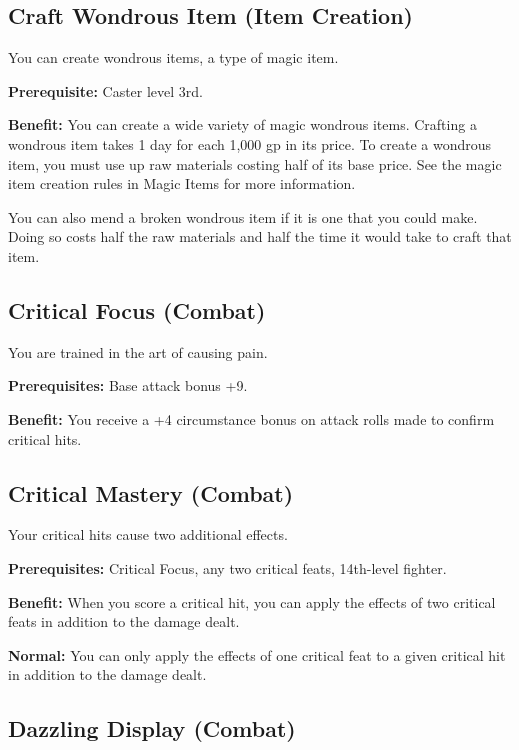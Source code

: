 \subsection{Craft Wondrous Item (Item Creation)}

				
You can create wondrous items, a type of magic item.
				
\textbf{Prerequisite:} Caster level 3rd.
				
\textbf{Benefit:} You can create a wide variety of magic wondrous items. Crafting a wondrous item takes 1 day for each 1,000 gp in its price. To create a wondrous item, you must use up raw materials costing half of its base price. See the magic item creation rules in Magic Items for more information.

You can also mend a broken wondrous item if it is one that you could make. Doing so costs half the raw materials and half the time it would take to craft that item.
				
\subsection{Critical Focus (Combat)}

				
You are trained in the art of causing pain.
				
\textbf{Prerequisites:} Base attack bonus +9.
				
\textbf{Benefit:} You receive a +4 circumstance bonus on attack rolls made to confirm critical hits.
				
\subsection{Critical Mastery (Combat)}

				
Your critical hits cause two additional effects.
				
\textbf{Prerequisites:} Critical Focus, any two critical feats, 14th-level fighter.
				
\textbf{Benefit:} When you score a critical hit, you can apply the effects of two critical feats in addition to the damage dealt.
				
\textbf{Normal:} You can only apply the effects of one critical feat to a given critical hit in addition to the damage dealt.
				
\subsection{Dazzling Display (Combat)}

